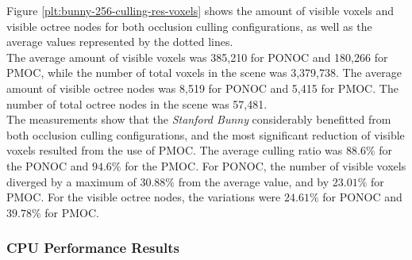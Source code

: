 \noindent
Figure \ref{plt:bunny-256-culling-res-voxels} shows the amount of visible voxels and visible 
octree nodes for both occlusion culling configurations, as well as the average values represented 
by the dotted lines. \\

\noindent
The average amount of visible voxels was 385,210 for \ac{PONOC} and 180,266 for \ac{PMOC},
while the number of total voxels in the scene was 3,379,738. The average amount of visible 
octree nodes was 8,519 for \ac{PONOC} and 5,415 for \ac{PMOC}. The number of total octree 
nodes in the scene was 57,481. \\

\noindent
The measurements show that the \emph{Stanford Bunny} considerably benefitted from both occlusion 
culling configurations, and the most significant reduction of visible voxels resulted from the use 
of \ac{PMOC}. The average culling ratio was $88.6\%$ for the \ac{PONOC} and $94.6\%$ for the 
\ac{PMOC}. For \ac{PONOC}, the number of visible voxels diverged by a maximum of $30.88\%$ from 
the average value, and by $23.01\%$ for \ac{PMOC}. For the visible octree nodes, the variations were 
$24.61\%$ for \ac{PONOC} and $39.78\%$ for \ac{PMOC}.

\subsubsection*{CPU Performance Results} \label{subsubsec-cpu-performance-results-bunny}

